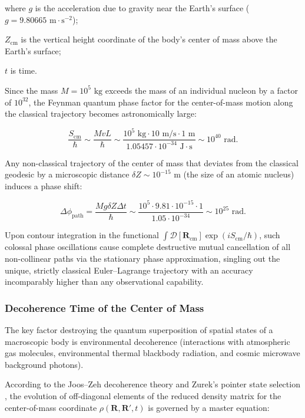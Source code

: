 \documentclass[11pt,a4paper]{article}
\theoremstyle{definition}
\begin{document}
where $g$ is the acceleration due to gravity near the Earth's surface ($g = 9.80665\text{ m}\cdot\text{s}^{-2}$);  

$Z_{\text{cm}}$ is the vertical height coordinate of the body's center of mass above the Earth's surface;  

$t$ is time.

Since the mass $M = 10^5\text{ kg}$ exceeds the mass of an individual nucleon by a factor of $10^{32}$, the Feynman quantum phase factor for the center-of-mass motion along the classical trajectory becomes astronomically large:

\begin{equation}\label{eq:5.6}\tag{5.6}
\frac{S_{\text{cm}}}{\hbar} \sim \frac{M v L}{\hbar} \sim \frac{10^5\text{ kg} \cdot 10\text{ m/s} \cdot 1\text{ m}}{1.05457 \cdot 10^{-34}\text{ J}\cdot\text{s}} \sim 10^{40}\text{ rad}.
\end{equation}

Any non-classical trajectory of the center of mass that deviates from the classical geodesic by a microscopic distance $\delta Z \sim 10^{-15}\text{ m}$ (the size of an atomic nucleus) induces a phase shift:

\begin{equation}\label{eq:5.7}\tag{5.7}
\Delta \phi_{\text{path}} = \frac{M g \delta Z \Delta t}{\hbar} \sim \frac{10^5 \cdot 9.81 \cdot 10^{-15} \cdot 1}{1.05 \cdot 10^{-34}} \sim 10^{25}\text{ rad}.
\end{equation}

Upon contour integration in the functional $\int \mathcal{D}[\mathbf{R}_{\text{cm}}] \exp(i S_{\text{cm}}/\hbar)$, such colossal phase oscillations cause complete destructive mutual cancellation of all non-collinear paths via the stationary phase approximation, singling out the unique, strictly classical Euler--Lagrange trajectory with an accuracy incomparably higher than any observational capability.

\subsubsection{Decoherence Time of the Center of Mass}\label{sec:5.1.3}

The key factor destroying the quantum superposition of spatial states of a macroscopic body is environmental decoherence (interactions with atmospheric gas molecules, environmental thermal blackbody radiation, and cosmic microwave background photons).

According to the Joos--Zeh decoherence theory \cite{ref38} and Zurek's pointer state selection \cite{ref39}, the evolution of off-diagonal elements of the reduced density matrix for the center-of-mass coordinate $\rho(\mathbf{R}, \mathbf{R}', t)$ is governed by a master equation:
\end{document}
